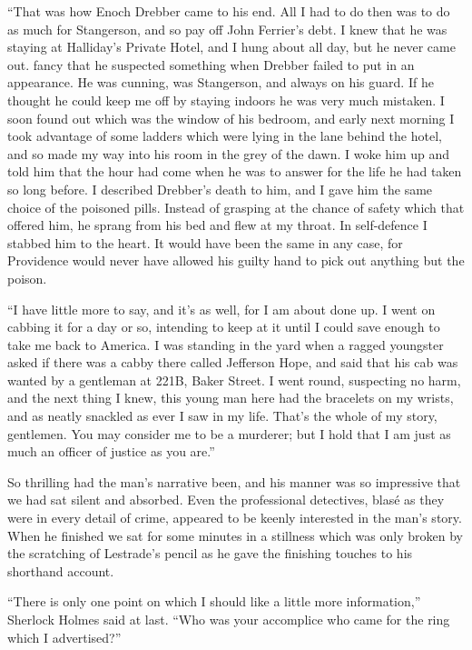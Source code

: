 \documentclass[12pt]{book}
\begin{document}
“That was how Enoch Drebber came to his end. All I had to do then was to do as much for Stangerson, and so pay off John Ferrier’s debt. I knew that he was staying at Halliday’s Private Hotel, and I hung about all day, but he never came out. fancy that he suspected something when Drebber failed to put in an appearance. He was cunning, was Stangerson, and always on his guard. If he thought he could keep me off by staying indoors he was very much mistaken. I soon found out which was the window of his bedroom, and early next morning I took advantage of some ladders which were lying in the lane behind the hotel, and so made my way into his room in the grey of the dawn. I woke him up and told him that the hour had come when he was to answer for the life he had taken so long before. I described Drebber’s death to him, and I gave him the same choice of the poisoned pills. Instead of grasping at the chance of safety which that offered him, he sprang from his bed and flew at my throat. In self-defence I stabbed him to the heart. It would have been the same in any case, for Providence would never have allowed his guilty hand to pick out anything but the poison. 

“I have little more to say, and it’s as well, for I am about done up. I went on cabbing it for a day or so, intending to keep at it until I could save enough to take me back to America. I was standing in the yard when a ragged youngster asked if there was a cabby there called Jefferson Hope, and said that his cab was wanted by a gentleman at 221B, Baker Street. I went round, suspecting no harm, and the next thing I knew, this young man here had the bracelets on my wrists, and as neatly snackled as ever I saw in my life. That’s the whole of my story, gentlemen. You may consider me to be a murderer; but I hold that I am just as much an officer of justice as you are.” 

So thrilling had the man’s narrative been, and his manner was so impressive that we had sat silent and absorbed. Even the professional detectives, blasé as they were in every detail of crime, appeared to be keenly interested in the man’s story. When he finished we sat for some minutes in a stillness which was only broken by the scratching of Lestrade’s pencil as he gave the finishing touches to his shorthand account. 

“There is only one point on which I should like a little more information,” Sherlock Holmes said at last. “Who was your accomplice who came for the ring which I advertised?” 
\end{document}
